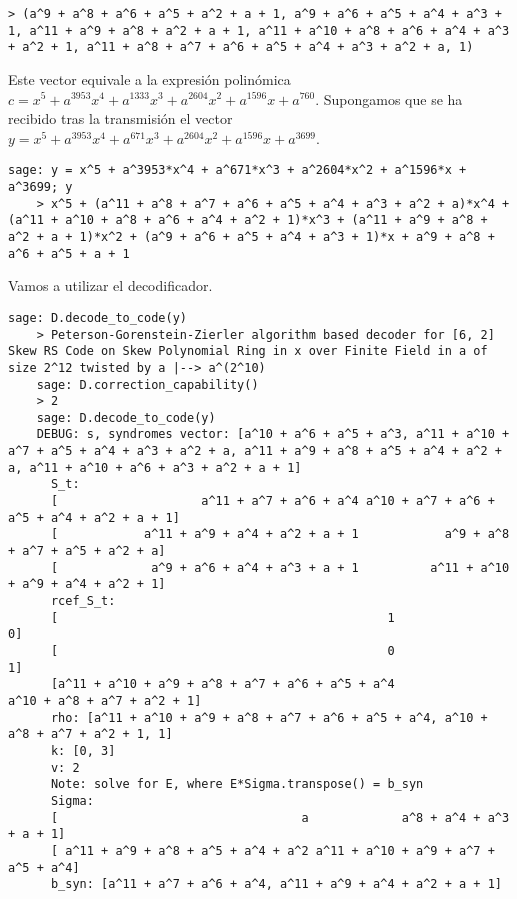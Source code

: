 \begin{example}
\begin{lstlisting}[gobble=4]
    > (a^9 + a^8 + a^6 + a^5 + a^2 + a + 1, a^9 + a^6 + a^5 + a^4 + a^3 + 1, a^11 + a^9 + a^8 + a^2 + a + 1, a^11 + a^10 + a^8 + a^6 + a^4 + a^3 + a^2 + 1, a^11 + a^8 + a^7 + a^6 + a^5 + a^4 + a^3 + a^2 + a, 1)
  \end{lstlisting}
  Este vector equivale a la expresión polinómica \(c = x^5 + a^{3953}x^4 + a^{1333}x^3 + a^{2604}x^2 + a^{1596}x + a^{760}\).
  Supongamos que se ha recibido tras la transmisión el vector \(y = x^5 + a^{3953}x^4 + a^{671}x^3 + a^{2604}x^2 + a^{1596}x + a^{3699}\).
  \begin{lstlisting}[gobble=4]
    sage: y = x^5 + a^3953*x^4 + a^671*x^3 + a^2604*x^2 + a^1596*x + a^3699; y
    > x^5 + (a^11 + a^8 + a^7 + a^6 + a^5 + a^4 + a^3 + a^2 + a)*x^4 + (a^11 + a^10 + a^8 + a^6 + a^4 + a^2 + 1)*x^3 + (a^11 + a^9 + a^8 + a^2 + a + 1)*x^2 + (a^9 + a^6 + a^5 + a^4 + a^3 + 1)*x + a^9 + a^8 + a^6 + a^5 + a + 1
  \end{lstlisting}
  Vamos a utilizar el decodificador.
  \begin{lstlisting}[gobble=4, basicstyle=\small\ttfamily]
    sage: D.decode_to_code(y)
    > Peterson-Gorenstein-Zierler algorithm based decoder for [6, 2] Skew RS Code on Skew Polynomial Ring in x over Finite Field in a of size 2^12 twisted by a |--> a^(2^10)
    sage: D.correction_capability()
    > 2
    sage: D.decode_to_code(y)
    DEBUG: s, syndromes vector: [a^10 + a^6 + a^5 + a^3, a^11 + a^10 + a^7 + a^5 + a^4 + a^3 + a^2 + a, a^11 + a^9 + a^8 + a^5 + a^4 + a^2 + a, a^11 + a^10 + a^6 + a^3 + a^2 + a + 1]
      S_t:
      [                    a^11 + a^7 + a^6 + a^4 a^10 + a^7 + a^6 + a^5 + a^4 + a^2 + a + 1]
      [            a^11 + a^9 + a^4 + a^2 + a + 1            a^9 + a^8 + a^7 + a^5 + a^2 + a]
      [             a^9 + a^6 + a^4 + a^3 + a + 1          a^11 + a^10 + a^9 + a^4 + a^2 + 1]
      rcef_S_t:
      [                                              1                                               0]
      [                                              0                                               1]
      [a^11 + a^10 + a^9 + a^8 + a^7 + a^6 + a^5 + a^4                      a^10 + a^8 + a^7 + a^2 + 1]
      rho: [a^11 + a^10 + a^9 + a^8 + a^7 + a^6 + a^5 + a^4, a^10 + a^8 + a^7 + a^2 + 1, 1]
      k: [0, 3]
      v: 2
      Note: solve for E, where E*Sigma.transpose() = b_syn
      Sigma:
      [                                  a             a^8 + a^4 + a^3 + a + 1]
      [ a^11 + a^9 + a^8 + a^5 + a^4 + a^2 a^11 + a^10 + a^9 + a^7 + a^5 + a^4]
      b_syn: [a^11 + a^7 + a^6 + a^4, a^11 + a^9 + a^4 + a^2 + a + 1]

\end{lstlisting}
\end{example}
